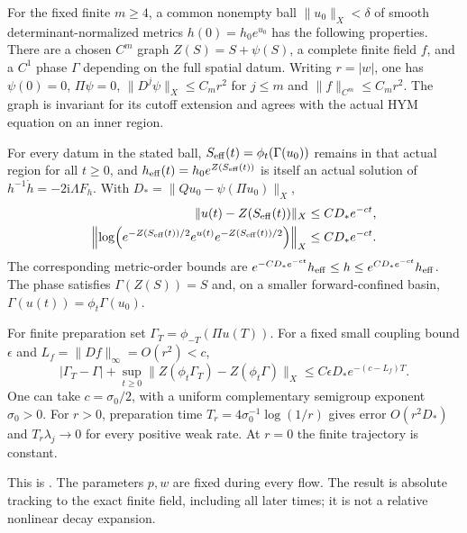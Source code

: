\begin{recollection}\label{thm:flow-input}
For the fixed finite $m\ge4$, a common nonempty ball
$\|u_0\|_X<\delta$ of smooth determinant-normalized metrics
$h(0)=h_0e^{u_0}$ has the following properties.
There are a chosen $C^m$ graph
$Z(S)=S+\psi(S)$, a complete finite field $f$, and a
$C^1$ phase $\Gamma$ depending on the full spatial datum.
Writing $r=|w|$, one has
$\psi(0)=0$, $\Pi\psi=0$,
$\|D^j\psi\|_X\le C_mr^2$ for $j\le m$ and
$\|f\|_{C^m}\le C_mr^2$.
The graph is invariant for its cutoff extension and agrees
with the actual HYM equation on an inner region.

For every datum in the stated ball,
$S_{\rm eff}(t)=\phi_t(\Gamma(u_0))$ remains in that actual
region for all $t\ge0$, and
$h_{\rm eff}(t)=h_0e^{Z(S_{\rm eff}(t))}$ is itself an actual
solution of $h^{-1}\dot h=-2\mathrm i\Lambda F_h$.
With $D_*=\|Qu_0-\psi(\Pi u_0)\|_X$,
\begin{equation}\label{eq:actual-flow-tracking}
 \begin{split}
 \|u(t)-Z(S_{\rm eff}(t))\|_X&\le CD_*e^{-ct},\\
 \left\|\log\!\left(e^{-Z(S_{\rm eff}(t))/2}
                  e^{u(t)}e^{-Z(S_{\rm eff}(t))/2}\right)\right\|_X
                                      &\le CD_*e^{-ct}.
 \end{split}
\end{equation}
The corresponding metric-order bounds are
$e^{-CD_*e^{-ct}}h_{\rm eff}\le h\le e^{CD_*e^{-ct}}h_{\rm eff}$.
The phase satisfies $\Gamma(Z(S))=S$ and, on a smaller
forward-confined basin, $\Gamma(u(t))=\phi_t\Gamma(u_0)$.

For finite preparation set $\Gamma_T=\phi_{-T}(\Pi u(T))$.
For a fixed small coupling bound $\epsilon$ and
$L_f=\|Df\|_\infty=O(r^2)<c$,
\begin{equation}\label{eq:finite-preparation}
 |\Gamma_T-\Gamma|+
 \sup_{t\ge0}\|Z(\phi_t\Gamma_T)-Z(\phi_t\Gamma)\|_X
                    \le C\epsilon D_*e^{-(c-L_f)T}.
\end{equation}
One can take $c=\sigma_0/2$, with a uniform complementary
semigroup exponent $\sigma_0>0$. For $r>0$, preparation time
$T_r=4\sigma_0^{-1}\log(1/r)$ gives error $O(r^2D_*)$
and $T_r\lambda_j\to0$ for every positive weak rate.
At $r=0$ the finite trajectory is constant.
\end{recollection}

This is \cite[Sections~9--11]{W_HYM}. The parameters $p,w$
are fixed during every flow. The result is absolute tracking
to the exact finite field, including all later times; it is
not a relative nonlinear decay expansion.

